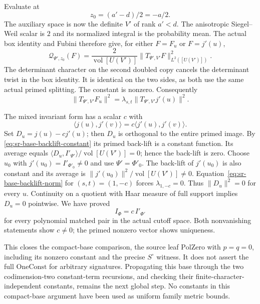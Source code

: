 Evaluate at
\[
                 z_0=(a'-d)/2=-a/2 .
\]
The auxiliary space is now the definite \(V'\) of rank
\(a'<d\). The anisotropic Siegel--Weil scalar is \(2\)
and its normalized integral is the probability mean.
The actual box identity and Fubini therefore give, for
either \(F=F_u\) or \(F=j'(u)\),
\[
 \mathcal Q_{\Psi',z_0}(F)
   =\frac{2}{\operatorname{vol}[U(V')]}
             \big\|T_{\Psi',V'}F\big\|^2_{L^2([U(V')])}.
\]
The determinant character on the second doubled copy
cancels the determinant twist in the box identity.
It is identical on the two sides, as both use the same
actual primed splitting. The constant is nonzero.
Consequently
\[
 \big\|T_{\Psi',V'}F_u\big\|^2
        =\lambda_{s,t}
                    \big\|T_{\Psi',V'}j'(u)\big\|^2 .
\tag{*****}\label{eq:sr-base-backlift-norm}
\]

The mixed invariant form has a scalar \(c\) with
\[
             \langle j(u),j'(v)\rangle
                       =c\langle j'(u),j'(v)\rangle .
\]
Set \(D_u=j(u)-cj'(u)\); then \(D_u\) is orthogonal to the
entire primed image. By
\eqref{eq:sr-base-backlift-constant} its primed back-lift
is a constant function. Its average equals
\(\langle D_u,I'_{\Psi'}\rangle/
                \operatorname{vol}[U(V')]=0\);
hence the back-lift is zero. Choose \(u_0\) with
\(j'(u_0)=I'_{\Phi'_0}\ne0\) and use
\(\Psi'=\Phi'_0\). The back-lift of \(j'(u_0)\) is also
constant and its average is
\(\|j'(u_0)\|^2/\operatorname{vol}[U(V')]\ne0\).
Equation~\eqref{eq:sr-base-backlift-norm} for \((s,t)=(1,-c)\)
forces \(\lambda_{1,-c}=0\). Thus \(\|D_u\|^2=0\) for every
\(u\). Continuity on a quotient with Haar measure of full
support implies \(D_u=0\) pointwise. We have proved
\[
                    I_\Phi=c\,I'_{\Phi'}
\]
for every polynomial matched pair in the actual cutoff
space. Both nonvanishing statements show \(c\ne0\);
the primed nonzero vector shows uniqueness.

This closes the compact-base comparison, the source leaf
\(\mathrm{PolZero}\) with \(p=q=0\), including its nonzero
constant and the precise \(S^\circ\) witness. It does not
assert the full \(\mathrm{OneConst}\) for arbitrary
signatures. Propagating this base through the two
codimension-two constant-term recursions, and checking
their finite-character-independent constants, remains
the next global step. No constants in this compact-base
argument have been used as uniform family metric bounds.
